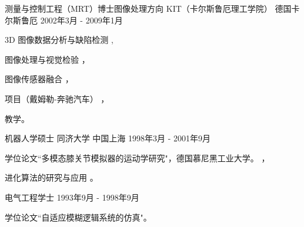 \documentclass[../cv_cn.tex]{subfiles}
\begin{document}
\begin{cventries}
  \cventry
    {测量与控制工程（MRT）博士\quad 图像处理方向} %
    {KIT（卡尔斯鲁厄理工学院）} %
    {德国卡尔斯鲁厄} %
    {2002年3月 - 2009年1月} %
    {
      \begin{cvitems} %
        \item 3D 图像数据分析与缺陷检测 \supercite{xin2008diss},
        \item 图像处理与视觉检验 \supercite{xin2009multiscale} \supercite{xin2007evaluation}，
        \item 图像传感器融合 \supercite{xin2004bildfolgenauswertung}，
        \item 项目（戴姆勒-奔驰汽车） \supercite{Xin_Daimler_08}，
        \item 教学。
      \end{cvitems}
    }

  \cventry
    {机器人学硕士} %
    {同济大学} %
    {中国上海} %
    {1998年3月 - 2001年9月} %
    {
      \begin{cvitems} %
        \item 学位论文``多模态膝关节模拟器的运动学研究"，德国慕尼黑工业大学。 \supercite{xin2002KneeSimulator}，
        \item 进化算法的研究与应用 \supercite{xin2002AntColony}。
      \end{cvitems}
    }

  \cventry
    {电气工程学士} %
    {} %
    {} %
    {1993年9月 - 1998年9月} %
    {
      \begin{cvitems} %
        \item 学位论文``自适应模糊逻辑系统的仿真"。
      \end{cvitems}
    }

\end{cventries}
\end{document}
